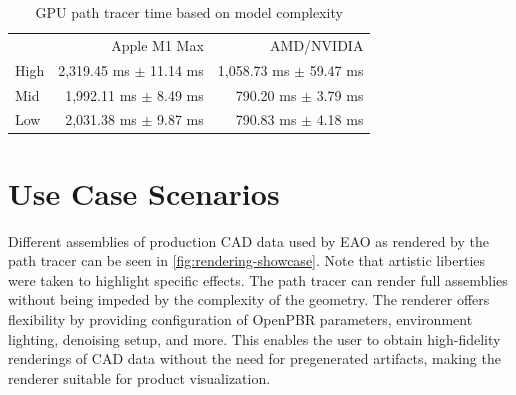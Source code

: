 \begin{table}[H]
    \centering
    \begin{tabular}{lrr}
        \toprule
             & Apple M1 Max               & AMD/NVIDIA                 \\
        High & 2,319.45 ms $\pm$ 11.14 ms & 1,058.73 ms $\pm$ 59.47 ms \\
        Mid  & 1,992.11 ms $\pm$ 8.49 ms  & 790.20 ms $\pm$ 3.79 ms    \\
        Low  & 2,031.38 ms $\pm$ 9.87 ms  & 790.83 ms $\pm$ 4.18 ms    \\
        \bottomrule
    \end{tabular}
    \caption{\gls{GPU} path tracer time based on model complexity}
    \label{tab:gpuPerformance}
\end{table}

\newpage
\section{Use Case Scenarios}

Different assemblies of production \gls{CAD} data used by EAO as rendered by the path tracer can be seen in \autoref{fig:rendering-showcase}. Note that artistic liberties were taken to highlight specific effects. The path tracer can render full assemblies without being impeded by the complexity of the geometry. The renderer offers flexibility by providing configuration of \gls{OpenPBR} parameters, environment lighting, denoising setup, and more. This enables the user to obtain high-fidelity renderings of \gls{CAD} data without the need for pregenerated artifacts, making the renderer suitable for product visualization.

